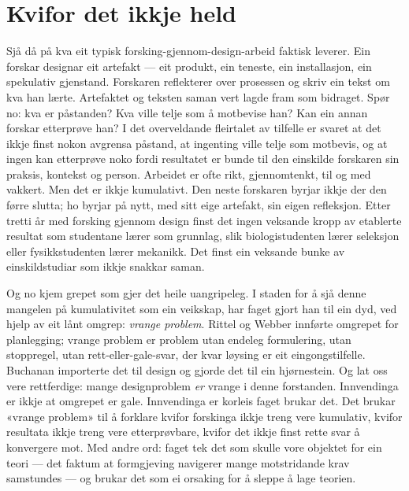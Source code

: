 \section{Kvifor det ikkje held}

Sjå då på kva eit typisk forsking-gjennom-design-arbeid faktisk leverer. Ein forskar designar eit artefakt — eit produkt, ein teneste, ein installasjon, ein spekulativ gjenstand. Forskaren reflekterer over prosessen og skriv ein tekst om kva han lærte. Artefaktet og teksten saman vert lagde fram som bidraget. Spør no: kva er påstanden? Kva ville telje som å motbevise han? Kan ein annan forskar etterprøve han? I det overveldande fleirtalet av tilfelle er svaret at det ikkje finst nokon avgrensa påstand, at ingenting ville telje som motbevis, og at ingen kan etterprøve noko fordi resultatet er bunde til den einskilde forskaren sin praksis, kontekst og person. Arbeidet er ofte rikt, gjennomtenkt, til og med vakkert. Men det er ikkje kumulativt. Den neste forskaren byrjar ikkje der den førre slutta; ho byrjar på nytt, med sitt eige artefakt, sin eigen refleksjon. Etter tretti år med forsking gjennom design finst det ingen veksande kropp av etablerte resultat som studentane lærer som grunnlag, slik biologistudenten lærer seleksjon eller fysikkstudenten lærer mekanikk. Det finst ein veksande bunke av einskildstudiar som ikkje snakkar saman.

Og no kjem grepet som gjer det heile uangripeleg. I staden for å sjå denne mangelen på kumulativitet som ein veikskap, har faget gjort han til ein dyd, ved hjelp av eit lånt omgrep: \emph{vrange problem}. Rittel og Webber innførte omgrepet for planlegging; vrange problem er problem utan endeleg formulering, utan stoppregel, utan rett-eller-gale-svar, der kvar løysing er eit eingongstilfelle. Buchanan importerte det til design og gjorde det til ein hjørnestein. Og lat oss vere rettferdige: mange designproblem \emph{er} vrange i denne forstanden. Innvendinga er ikkje at omgrepet er gale. Innvendinga er korleis faget brukar det. Det brukar «vrange problem» til å forklare kvifor forskinga ikkje treng vere kumulativ, kvifor resultata ikkje treng vere etterprøvbare, kvifor det ikkje finst rette svar å konvergere mot. Med andre ord: faget tek det som skulle vore objektet for ein teori — det faktum at formgjeving navigerer mange motstridande krav samstundes — og brukar det som ei orsaking for å sleppe å lage teorien.

